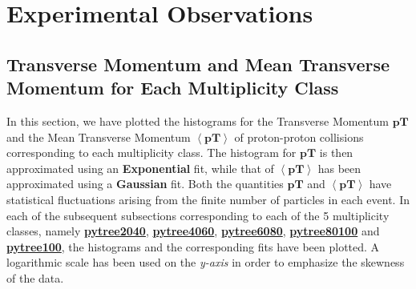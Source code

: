 \documentclass[letterpaper,aps,prc,superscriptaddress,nofootinbib,10pt,showpacs,floatfix]{revtex4-2}%
\begin{document}
\section{Experimental Observations }














\subsection{Transverse Momentum and Mean Transverse Momentum for Each Multiplicity Class}
In this section, we have plotted the histograms for the Transverse Momentum $\mathbf{pT}$ and the Mean Transverse Momentum $\mathbf{\left<pT\right>}$ of proton-proton collisions corresponding to each multiplicity class. The histogram for $\mathbf{pT}$ is then approximated using an \textbf{Exponential} fit, while that of $\mathbf{\left<pT\right>}$ has been approximated using a \textbf{Gaussian} fit. Both the quantities $\mathbf{pT}$ and $\mathbf{\left<pT\right>}$ have statistical fluctuations arising from the finite number of particles in each event. In each of the subsequent subsections corresponding to each of the 5 multiplicity classes, namely \hyperref[subsubsec:2040]{\textbf{pytree2040}}, \hyperref[subsubsec:4060]{\textbf{pytree4060}}, \hyperref[subsubsec:6080]{\textbf{pytree6080}}, \hyperref[subsubsec:80100]{\textbf{pytree80100}} and \hyperref[subsubsec:100]{\textbf{pytree100}}, the histograms and the corresponding fits have been plotted. A logarithmic scale has been used on the \emph{y-axis} in order to emphasize the skewness of the data. 
\end{document}
